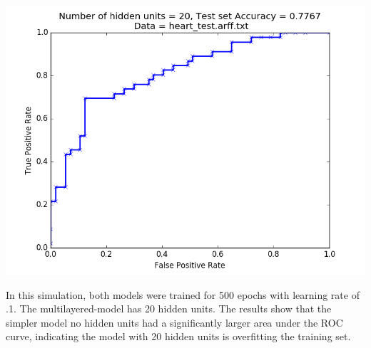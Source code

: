 \documentclass[paper=a4, fontsize=11pt]{scrartcl} %
\numberwithin{equation}{section} %
\numberwithin{figure}{section} %
\numberwithin{table}{section} %
\begin{document}
\begin{center}
\includegraphics[scale=.45]{pics/roc_hidden_heart.png}
\end{center}

In this simulation, both models were trained for 500 epochs with learning rate of .1. The multilayered-model has 20 hidden units. The results show that the simpler model no hidden units had a significantly larger area under the ROC curve, indicating the model with 20 hidden units is overfitting the training set. 
\end{document}

